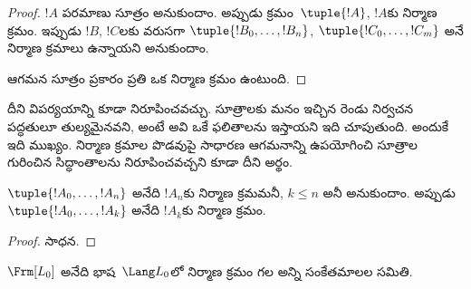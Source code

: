 \documentclass[../../../include/open-logic-section]{subfiles}
\begin{document}
\begin{proof}
$!A$ పరమాణు సూత్రం అనుకుందాం. అప్పుడు క్రమం~$\tuple{!A}$,
$!A$కు నిర్మాణ క్రమం.
%
ఇప్పుడు $!B$, $!C$లకు వరుసగా
$\tuple{!B_0,\dotsc,!B_n}$, $\tuple{!C_0,\dotsc,!C_m}$ అనే నిర్మాణ
క్రమాలు ఉన్నాయని అనుకుందాం.
%
\begin{enumerate}
\end{enumerate}
 ఆగమన సూత్రం ప్రకారం ప్రతి  ఒక నిర్మాణ
క్రమం ఉంటుంది.
\end{proof}

దీని విపర్యయాన్ని కూడా నిరూపించవచ్చు. సూత్రాలకు మనం ఇచ్చిన రెండు
నిర్వచన పద్ధతులూ తుల్యమైనవని, అంటే అవి ఒకే ఫలితాలను ఇస్తాయని ఇది
చూపుతుంది. అందుకే ఇది ముఖ్యం. నిర్మాణ క్రమాల పొడవుపై సాధారణ ఆగమనాన్ని
ఉపయోగించి సూత్రాల గురించిన సిద్ధాంతాలను నిరూపించవచ్చని కూడా దీని
అర్థం.

\begin{lem}
$\tuple{!A_0,\dotsc,!A_n}$ అనేది $!A_n$కు నిర్మాణ క్రమమనీ,
$k \leq n$ అనీ అనుకుందాం. అప్పుడు
$\tuple{!A_0,\dotsc,!A_k}$ అనేది $!A_k$కు నిర్మాణ క్రమం.
\end{lem}

\begin{proof}
సాధన.
\end{proof}

\begin{thm}
$\Frm[L_0]$ అనేది భాష~$\Lang L_0$లో నిర్మాణ క్రమం గల అన్ని
సంకేతమాలల సమితి.
\end{thm}
\end{document}
